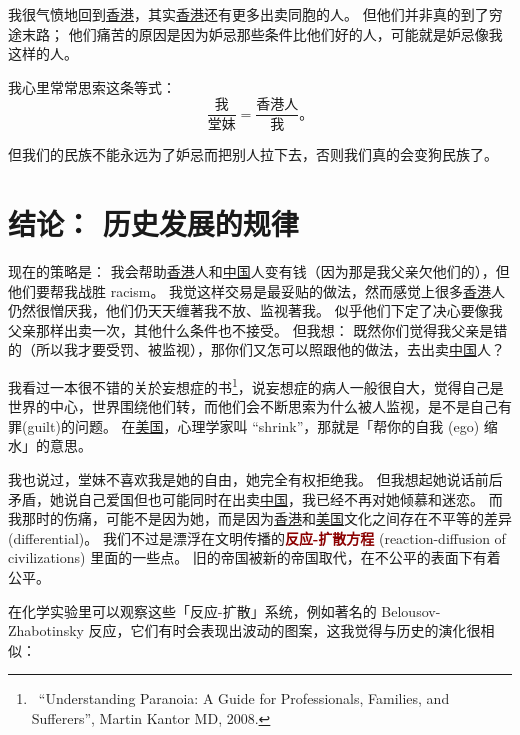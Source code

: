 \documentclass[12pt]{report}
\renewcommand{\em}[1]{\textbf{\textcolor{DarkRed}{#1}}}
\begin{document}
{我很气愤地回到\uline{香港}，其实\uline{香港}还有更多出卖同胞的人。%
但他们并非真的到了穷途末路； 他们痛苦的原因是因为妒忌那些条件比他们好的人，可能就是妒忌像我这样的人。

我心里常常思索这条等式：
$$ \frac{\mbox{我}}{\mbox{堂妹}} = \frac{\mbox{香港人}}{\mbox{我}} \mbox{。}$$

但我们的民族不能永远为了妒忌而把别人拉下去，否则我们真的会变狗民族了。

\chapter{结论： 历史发展的规律}

现在的策略是： 我会帮助\uline{香港}人和\uline{中国}人变有钱（因为那是我父亲欠他们的），但他们要帮我战胜 racism。 我觉这样交易是最妥贴的做法，然而感觉上很多\uline{香港}人仍然很憎厌我，他们仍天天缠著我不放、监视著我。 似乎他们下定了决心要像我父亲那样出卖一次，其他什么条件也不接受。 但我想： 既然你们觉得我父亲是错的（所以我才要受罚、被监视），那你们又怎可以照跟他的做法，去出卖\uline{中国}人？

我看过一本很不错的关於妄想症的书\footnote{\ ``Understanding Paranoia: A Guide for Professionals, Families, and Sufferers'', Martin Kantor MD, 2008.}，说妄想症的病人一般很自大，觉得自己是世界的中心，世界围绕他们转，而他们会不断思索为什么被人监视，是不是自己有罪(guilt)的问题。 在\uline{美国}，心理学家叫 ``shrink''，那就是「帮你的自我 (ego) 缩水」的意思。

我也说过，堂妹不喜欢我是她的自由，她完全有权拒绝我。 但我想起她说话前后矛盾，她说自己爱国但也可能同时在出卖\uline{中国}，我已经不再对她倾慕和迷恋。 而我那时的伤痛，可能不是因为她，而是因为\uline{香港}和\uline{美国}文化之间存在不平等的差异 (differential)。 我们不过是漂浮在文明传播的\em{反应-扩散方程} (reaction-diffusion of civilizations) 里面的一些点。 旧的帝国被新的帝国取代，在不公平的表面下有着公平。

在化学实验里可以观察这些「反应-扩散」系统，例如著名的 Belousov-Zhabotinsky 反应，它们有时会表现出波动的图案，这我觉得与历史的演化很相似：

}
\end{document}
